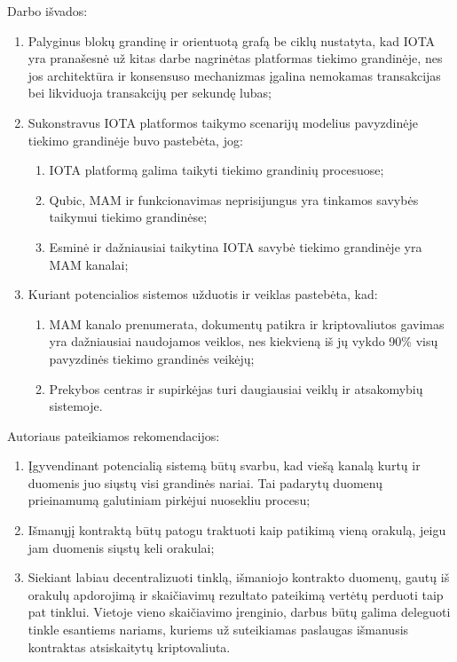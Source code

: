 

Darbo išvados:
\begin{enumerate}
    \item Palyginus blokų grandinę ir orientuotą grafą be ciklų nustatyta, kad IOTA yra pranašesnė už kitas darbe nagrinėtas platformas tiekimo grandinėje, nes jos architektūra ir konsensuso mechanizmas įgalina nemokamas transakcijas bei likviduoja transakcijų per sekundę lubas;
    \item Sukonstravus IOTA platformos taikymo scenarijų modelius pavyzdinėje tiekimo grandinėje buvo pastebėta, jog:
    \begin{enumerate}[label*=\arabic*.,topsep=0pt]
        \item IOTA platformą galima taikyti tiekimo grandinių procesuose;
        \item Qubic, MAM ir funkcionavimas neprisijungus yra tinkamos savybės taikymui tiekimo grandinėse;
        \item Esminė ir dažniausiai taikytina IOTA savybė tiekimo grandinėje yra MAM kanalai;
    \end{enumerate} 
    \item Kuriant potencialios sistemos užduotis ir veiklas pastebėta, kad:
    \begin{enumerate}[label*=\arabic*.,topsep=0pt]
        \item MAM kanalo prenumerata, dokumentų patikra ir kriptovaliutos gavimas yra dažniausiai naudojamos veiklos, nes kiekvieną iš jų vykdo 90\% visų pavyzdinės tiekimo grandinės veikėjų;
        \item Prekybos centras ir supirkėjas turi daugiausiai veiklų ir atsakomybių sistemoje.
    \end{enumerate}
\end{enumerate}
\bigskip

Autoriaus pateikiamos rekomendacijos:
\begin{enumerate}
    \item Įgyvendinant potencialią sistemą būtų svarbu, kad viešą kanalą kurtų ir duomenis juo siųstų visi grandinės nariai. Tai padarytų duomenų prieinamumą galutiniam pirkėjui nuosekliu procesu;
    \item Išmanųjį kontraktą būtų patogu traktuoti kaip patikimą vieną orakulą, jeigu jam duomenis siųstų keli orakulai;
    \item Siekiant labiau decentralizuoti tinklą, išmaniojo kontrakto duomenų, gautų iš orakulų apdorojimą ir skaičiavimų rezultato pateikimą vertėtų perduoti taip pat tinklui. Vietoje vieno skaičiavimo įrenginio, darbus būtų galima deleguoti tinkle esantiems nariams, kuriems už suteikiamas paslaugas išmanusis kontraktas atsiskaitytų kriptovaliuta.
\end{enumerate} 
\bigskip

